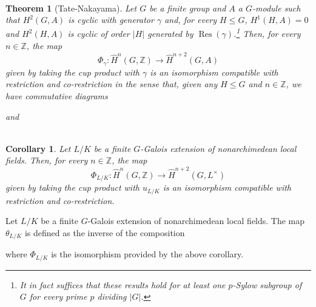 \documentclass[11pt]{article}
\newcommand{\Z}{\mathbb{Z}}
\DeclareMathOperator{\ab}{ab} %
\DeclareMathOperator{\CoRes}{CoRes} %
\DeclareMathOperator{\Res}{Res} %
\newtheorem*{corollary*}{\\Corollary}
\newtheorem*{theorem*}{\\Theorem}
\begin{document}
\begin{theorem*}[Tate-Nakayama]
Let $G$ be a finite group and $A$ a $G$-module such that $H^2(G,A)$ is cyclic with generator $\gamma$ and, for every $H\leq G$, $H^1(H,A)=0$ and $H^2(H,A)$ is cyclic of order $|H|$ generated by $\Res(\gamma)$.\footnote{It in fact suffices that these results hold for at least one $p$-Sylow subgroup of $G$ for every prime $p$ dividing $|G|$.} Then, for every $n\in\Z$, the map 
$$\Phi_{\gamma}: \hat{H}^n(G,\Z)\to\hat{H}^{n+2}(G,A)$$
given by taking the cup product with $\gamma$ is an isomorphism compatible with restriction and co-restriction in the sense that, given any $H\leq G$ and $n\in\Z$, we have commutative diagrams
\begin{center}
\textrm{and}
\end{center}
\end{theorem*}

\begin{corollary*}
Let $L/K$ be a finite $G$-Galois extension of nonarchimedean local fields. Then, for every $n\in\Z$, the map 
$$\Phi_{L/K}: \hat{H}^n(G,\Z)\to\hat{H}^{n+2}(G,L^{\times})$$
given by taking the cup product with $u_{L/K}$ is an isomorphism compatible with restriction and co-restriction.
\end{corollary*}

Let $L/K$ be a finite $G$-Galois extension of nonarchimedean local fields. The map $\theta_{L/K}$ is defined as the inverse of the composition
\begin{center}
\end{center}
where $\Phi_{L/K}$ is the isomorphism provided by the above corollary.
\end{document}
